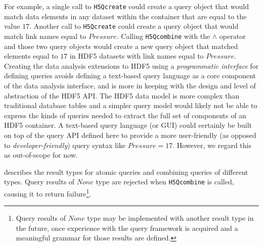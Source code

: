 \documentclass[letterpaper,hyper]{THG_RFC}
\begin{document}
For example, a single call to \texttt{H5Qcreate} could create a query object
that would match data elements in any dataset within the container that are
equal to the value $17$. Another call to \texttt{H5Qcreate} could create a
query object that would match link names equal to $Pressure$.
Calling \texttt{H5Qcombine} with the $\land$ operator and those two query
objects would create a new query object that matched elements equal to $17$
in HDF5 datasets with link names equal to $Pressure$.
Creating the data analysis extensions to HDF5 using a \textit{programmatic
interface} for defining queries avoids defining a text-based query language
as a core component of the data analysis interface, and is more in keeping with
the design and level of abstraction of the HDF5 API.
The HDF5 data model is more complex than traditional database tables and a
simpler query model would likely not be able to express the kinds of queries
needed to extract the full set of components of an HDF5 container. A text-based
query language (or GUI) could certainly be built on top of the query API
defined here to provide a more user-friendly (as opposed to
\textit{developer-friendly}) query syntax like $Pressure = 17$. However, we
regard this as out-of-scope for now.

 describes the result types for atomic queries and
combining queries of different types. Query results of $None$ type are rejected
when \texttt{H5Qcombine} is called, causing it to return failure\footnote{Query
results of $None$ type may be implemented with another result type in the
future, once experience with the query framework is acquired and a meaningful
grammar for those results are defined.}.
\end{document}
